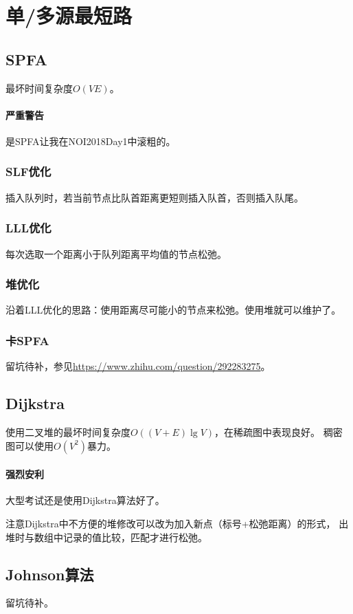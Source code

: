 \section{单/多源最短路}
\subsection{SPFA}
最坏时间复杂度$O(VE)$。
\paragraph{严重警告}
是SPFA让我在NOI2018Day1中滚粗的。
\subsubsection{SLF优化}
插入队列时，若当前节点比队首距离更短则插入队首，否则插入队尾。
\subsubsection{LLL优化}
每次选取一个距离小于队列距离平均值的节点松弛。
\subsubsection{堆优化}
沿着LLL优化的思路：使用距离尽可能小的节点来松弛。使用堆就可以维护了。
\subsubsection{卡SPFA}
留坑待补，参见\url{https://www.zhihu.com/question/292283275}。
\subsection{Dijkstra}
使用二叉堆的最坏时间复杂度$O((V+E)\lg V)$，在稀疏图中表现良好。
稠密图可以使用$O(V^2)$暴力。
\paragraph{强烈安利}
大型考试还是使用Dijkstra算法好了。

注意Dijkstra中不方便的堆修改可以改为加入新点（标号+松弛距离）的形式，
出堆时与数组中记录的值比较，匹配才进行松弛。
\subsection{Johnson算法}
留坑待补。
